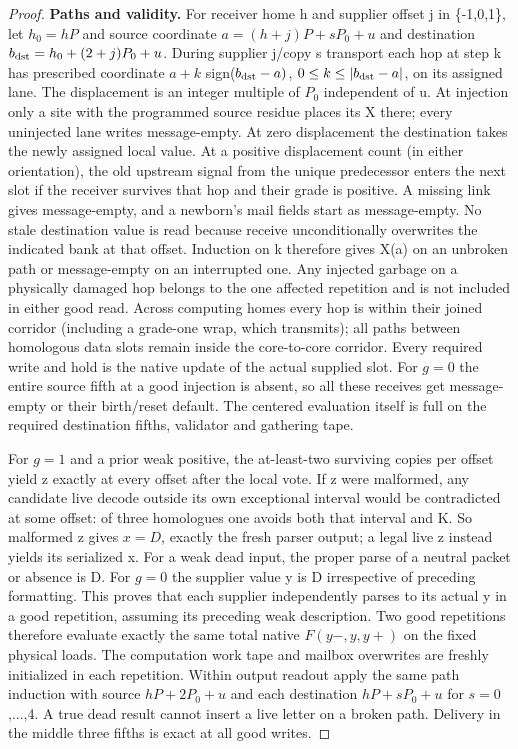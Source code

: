 \begin{proof}
\textbf{Paths and validity.} For receiver home h and supplier offset j in \{-1,0,1\}, let \(h_0=hP\) and source coordinate \(a=(h+j)P+sP_0+u\) and destination \(b_{\rm dst}=h_0+(2+j)P_0+u\). During supplier j/copy s transport each hop at step k has prescribed coordinate \(a+k\) sign(\(b_{\rm dst}- a)\), \(0\le k\le |b_{\rm dst}- a|\), on its assigned lane. The displacement is an integer multiple of \(P_0\) independent of u. At injection only a site with the programmed source residue places its X there; every uninjected lane writes message-empty. At zero displacement the destination takes the newly assigned local value. At a positive displacement count (in either orientation), the old upstream signal from the unique predecessor enters the next slot if the receiver survives that hop and their grade is positive. A missing link gives message-empty, and a newborn's mail fields start as message-empty. No stale destination value is read because receive unconditionally overwrites the indicated bank at that offset. Induction on k therefore gives X(a) on an unbroken path or message-empty on an interrupted one. Any injected garbage on a physically damaged hop belongs to the one affected repetition and is not included in either good read. Across computing homes every hop is within their joined corridor (including a grade-one wrap, which transmits); all paths between homologous data slots remain inside the core-to-core corridor. Every required write and hold is the native update of the actual supplied slot. For \(g=0\) the entire source fifth at a good injection is absent, so all these receives get message-empty or their birth/reset default. The centered evaluation itself is full on the required destination fifths, validator and gathering tape.

For \(g=1\) and a prior weak positive, the at-least-two surviving copies per offset yield z exactly at every offset after the local vote. If z were malformed, any candidate live decode outside its own exceptional interval would be contradicted at some offset: of three homologues one avoids both that interval and K. So malformed z gives \(x=D\), exactly the fresh parser output; a legal live z instead yields its serialized x. For a weak dead input, the proper parse of a neutral packet or absence is D. For \(g=0\) the supplier value y is D irrespective of preceding formatting. This proves that each supplier independently parses to its actual y in a good repetition, assuming its preceding weak description. Two good repetitions therefore evaluate exactly the same total native \(F(y- ,y,y+)\) on the fixed physical loads. The computation work tape and mailbox overwrites are freshly initialized in each repetition. Within output readout apply the same path induction with source \(hP+2P_0+u\) and each destination \(hP+sP_0+u\) for \(s=0\),...,4. A true dead result cannot insert a live letter on a broken path. Delivery in the middle three fifths is exact at all good writes.


\end{proof}
